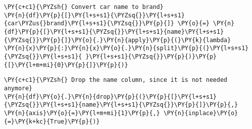 \begin{tcolorbox}[breakable, size=fbox, boxrule=1pt, pad at break*=1mm,colback=cellbackground, colframe=cellborder]
\begin{Verbatim}[commandchars=\\\{\}]
\PY{c+c1}{\PYZsh{} Convert car name to brand}
\PY{n}{df}\PY{p}{[}\PY{l+s+s1}{\PYZsq{}}\PY{l+s+s1}{car\PYZus{}brand}\PY{l+s+s1}{\PYZsq{}}\PY{p}{]} \PY{o}{=} \PY{n}{df}\PY{p}{[}\PY{l+s+s1}{\PYZsq{}}\PY{l+s+s1}{name}\PY{l+s+s1}{\PYZsq{}}\PY{p}{]}\PY{o}{.}\PY{n}{apply}\PY{p}{(}\PY{k}{lambda} \PY{n}{x}\PY{p}{:}\PY{n}{x}\PY{o}{.}\PY{n}{split}\PY{p}{(}\PY{l+s+s1}{\PYZsq{}}\PY{l+s+s1}{ }\PY{l+s+s1}{\PYZsq{}}\PY{p}{)}\PY{p}{[}\PY{l+m+mi}{0}\PY{p}{]}\PY{p}{)}
\end{Verbatim}
\end{tcolorbox}

\begin{tcolorbox}[breakable, size=fbox, boxrule=1pt, pad at break*=1mm,colback=cellbackground, colframe=cellborder]
\begin{Verbatim}[commandchars=\\\{\}]
\PY{c+c1}{\PYZsh{} Drop the name column, since it is not needed anymore}
\PY{n}{df}\PY{o}{.}\PY{n}{drop}\PY{p}{(}\PY{p}{[}\PY{l+s+s1}{\PYZsq{}}\PY{l+s+s1}{name}\PY{l+s+s1}{\PYZsq{}}\PY{p}{]}\PY{p}{,} \PY{n}{axis}\PY{o}{=}\PY{l+m+mi}{1}\PY{p}{,} \PY{n}{inplace}\PY{o}{=}\PY{k+kc}{True}\PY{p}{)}
\end{Verbatim}
\end{tcolorbox}

